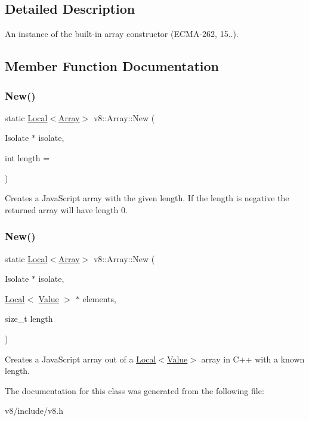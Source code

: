 \subsection{Detailed Description}
An instance of the built-\/in array constructor (E\+C\+M\+A-\/262, 15..). 

\subsection{Member Function Documentation}
\mbox{\label{classv8_1_1Array_a892f18fe6a25dfc0bc7b435759a30226}} 
\subsubsection{\texorpdfstring{New()}{New()}\hspace{0.1cm}{\footnotesize\ttfamily [1/2]}}
{\footnotesize\ttfamily static \mbox{\hyperlink{classv8_1_1Local}{Local}}$<$\mbox{\hyperlink{classv8_1_1Array}{Array}}$>$ v8\+::\+Array\+::\+New (\begin{DoxyParamCaption}\item[{Isolate $\ast$}]{isolate,  }\item[{int}]{length = {} }\end{DoxyParamCaption})\hspace{0.3cm}{\ttfamily [static]}}

Creates a Java\+Script array with the given length. If the length is negative the returned array will have length 0. \mbox{\label{classv8_1_1Array_a748ab878a787989d9970d6e647677974}} 
\subsubsection{\texorpdfstring{New()}{New()}\hspace{0.1cm}{\footnotesize\ttfamily [2/2]}}
{\footnotesize\ttfamily static \mbox{\hyperlink{classv8_1_1Local}{Local}}$<$\mbox{\hyperlink{classv8_1_1Array}{Array}}$>$ v8\+::\+Array\+::\+New (\begin{DoxyParamCaption}\item[{Isolate $\ast$}]{isolate,  }\item[{\mbox{\hyperlink{classv8_1_1Local}{Local}}$<$ \mbox{\hyperlink{classv8_1_1Value}{Value}} $>$ $\ast$}]{elements,  }\item[{size\+\_\+t}]{length }\end{DoxyParamCaption})\hspace{0.3cm}{\ttfamily [static]}}

Creates a Java\+Script array out of a \mbox{\hyperlink{classv8_1_1Local}{Local$<$\+Value$>$}} array in C++ with a known length. 

The documentation for this class was generated from the following file\+:\begin{DoxyCompactItemize}
\item 
v8/include/v8.\+h\end{DoxyCompactItemize}
